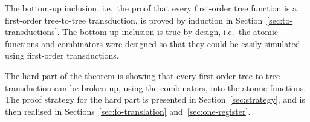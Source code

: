 The bottom-up inclusion, i.e.~the proof that every first-order tree function is a first-order tree-to-tree transduction, is proved by induction in Section~\ref{sec:to-transductions}.  The bottom-up inclusion is true by design, i.e.~the atomic functions and combinators were designed so that they could be easily  simulated using first-order transductions. 

The hard part of the theorem is showing that every first-order tree-to-tree transduction can be broken up, using the combinators, into the atomic functions. The proof strategy for the hard part is presented in Section~\ref{sec:strategy}, and is then realised in Sections~\ref{sec:fo-translation} and~\ref{sec:one-register}.